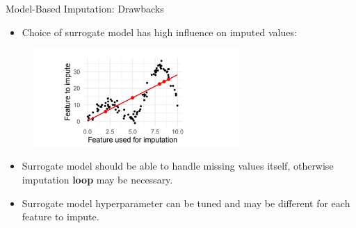 \begin{vbframe}{Model-Based Imputation: Drawbacks}
\begin{itemize}
\item Choice of surrogate model has high influence on imputed values:
\end{itemize}
\vspace{+.3cm}


\begin{figure}
\includegraphics[width = 0.7\textwidth]{figure_man/drawbacks.png}
\end{figure}

\begin{itemize}
\item Surrogate model should be able to handle missing values itself, otherwise imputation \textbf{loop} may be necessary.
\item Surrogate model hyperparameter can be tuned and may be different for each feature to impute.
\end{itemize}
\end{vbframe}

\endlecture


